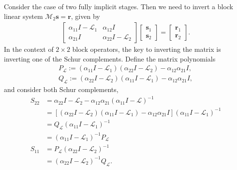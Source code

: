 \documentclass[a4paper,10pt]{article}
\begin{document}
Consider the case of two fully implicit stages. Then we need to invert a block linear system
$\mathcal{M}_2\mathbf{s} = \mathbf{r}$, given by
%
\begin{align}\label{eq:Mnt}
\begin{bmatrix} \alpha_{11} I - \mathcal{L}_1 & \alpha_{12}I \\ \alpha_{21}I & \alpha_{22}I - \mathcal{L}_2\end{bmatrix}
	\begin{bmatrix}\mathbf{s}_1 \\ \mathbf{s}_2 \end{bmatrix} = 
	\begin{bmatrix}\mathbf{r}_1 \\ \mathbf{r}_2 \end{bmatrix}.
\end{align}
%
In the context of $2\times 2$ block operators, the key to inverting the matrix is inverting one of
the Schur complements. Define the matrix polynomials
%
\begin{align*}
P_{\mathcal{L}} := (\alpha_{11}I - \mathcal{L}_1)(\alpha_{22}I - \mathcal{L}_2) - \alpha_{12}\alpha_{21}I, \\
Q_{\mathcal{L}} := (\alpha_{22}I - \mathcal{L}_2)(\alpha_{11}I - \mathcal{L}_1) - \alpha_{12}\alpha_{21}I,
\end{align*}
%
and consider both Schur complements,
%
\begin{align*}
S_{22} & = \alpha_{22} I - \mathcal{L}_2 - \alpha_{12}\alpha_{21}(\alpha_{11} I - \mathcal{L} )^{-1} \\
& = \left[ ( \alpha_{22} I - \mathcal{L}_2)(\alpha_{11} I - \mathcal{L}_1) - \alpha_{12}\alpha_{21}I \right]
	(\alpha_{11} I - \mathcal{L}_1 )^{-1} \\
& = Q_{\mathcal{L}}(\alpha_{11} I - \mathcal{L}_1 )^{-1} \\
& = (\alpha_{11} I - \mathcal{L}_1 )^{-1}P_{\mathcal{L}} \\
S_{11} & = P_{\mathcal{L}}(\alpha_{22} I - \mathcal{L}_2 )^{-1} \\
& = (\alpha_{22} I - \mathcal{L}_2 )^{-1}Q_{\mathcal{L}}.
\end{align*}
%
\end{document}
